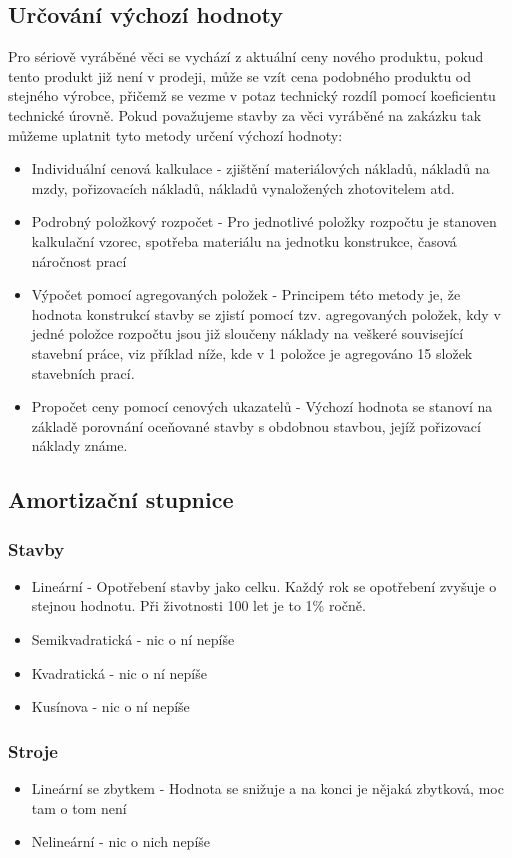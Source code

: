 \subsection{Určování výchozí hodnoty}
Pro sériově vyráběné věci se vychází z aktuální ceny nového produktu, pokud tento produkt již není v prodeji, může se vzít cena podobného produktu od 
stejného výrobce, přičemž se vezme v potaz technický rozdíl pomocí koeficientu technické úrovně.
Pokud považujeme stavby za věci vyráběné na zakázku tak můžeme uplatnit tyto metody určení výchozí hodnoty:
\begin{itemize}
    \item Individuální cenová kalkulace - zjištění materiálových nákladů, nákladů na mzdy, pořizovacích nákladů, nákladů vynaložených zhotovitelem atd.
    \item Podrobný položkový rozpočet -  Pro jednotlivé položky rozpočtu je stanoven kalkulační vzorec, spotřeba materiálu na jednotku konstrukce, časová náročnost prací
    \item Výpočet pomocí agregovaných položek - Principem této metody je, že hodnota konstrukcí stavby se zjistí pomocí tzv. agregovaných položek, kdy v jedné položce rozpočtu jsou již sloučeny náklady na veškeré
    související stavební práce, viz příklad níže, kde v 1 položce je agregováno 15 složek stavebních prací.
    \item Propočet ceny pomocí cenových ukazatelů - Výchozí hodnota se stanoví na základě porovnání oceňované stavby s obdobnou stavbou, jejíž pořizovací náklady známe.
\end{itemize}

\subsection{Amortizační stupnice}
\subsubsection*{Stavby}
\begin{itemize}
    \item Lineární - Opotřebení stavby jako celku. Každý rok se opotřebení zvyšuje o stejnou hodnotu. Při životnosti 100 let je to 1\% ročně.
    \item Semikvadratická - nic o ní nepíše
    \item Kvadratická - nic o ní nepíše
    \item Kusínova - nic o ní nepíše
\end{itemize}
\subsubsection*{Stroje}
\begin{itemize}
    \item Lineární se zbytkem - Hodnota se snižuje a na konci je nějaká zbytková, moc tam o tom není
    \item Nelineární - nic o nich nepíše
\end{itemize}


